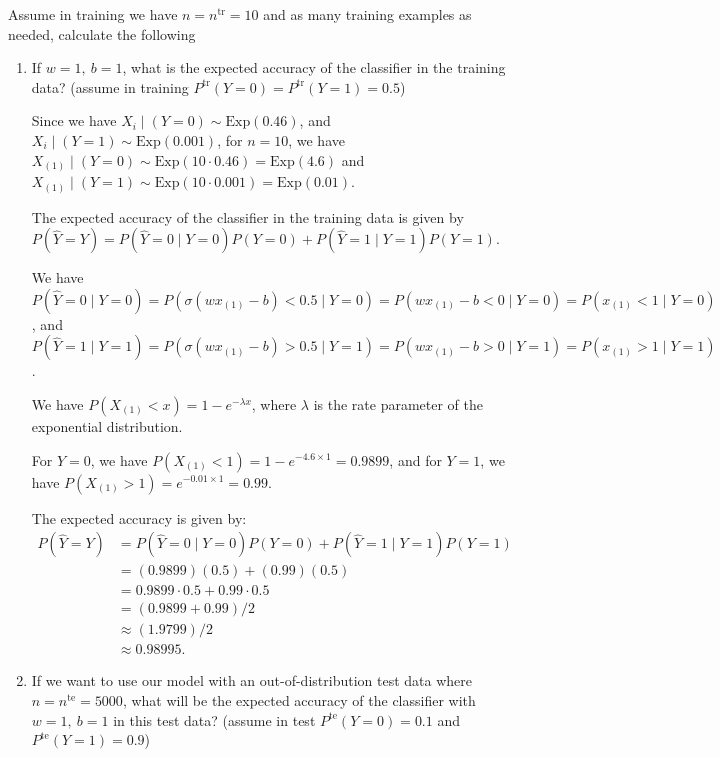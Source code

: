 \begin{enumerate}
Assume in training we have $n= n^\text{tr}=10$ and as many training examples as needed,
calculate the following \\
\begin{enumerate}
    \item If $w=1,\ b=1$, what is the expected accuracy of the classifier in the training data? (assume in training $P^\text{tr}(Y=0)=P^\text{tr}(Y=1)=0.5$)

    Since we have $X_i \mid (Y = 0) \sim \text{Exp}(0.46)$, and $X_i \mid (Y =
    1) \sim \text{Exp}(0.001)$, for $n=10$, we have $X_{(1)} \mid (Y = 0) \sim
    \text{Exp}(10 \cdot 0.46) = \text{Exp}(4.6)$ and $X_{(1)} \mid (Y = 1) \sim
    \text{Exp}(10 \cdot 0.001) = \text{Exp}(0.01)$.

    The expected accuracy of the classifier in the training data is given by
    $P(\hat{Y} = Y) = P(\hat{Y} = 0 \mid Y = 0) P(Y = 0) + P(\hat{Y} = 1 \mid Y
    = 1) P(Y = 1)$.

    We have $P(\hat{Y} = 0 \mid Y = 0) = P(\sigma(w x_{(1)} - b) < 0.5 \mid Y =
    0) = P(w x_{(1)} - b < 0 \mid Y = 0) = P(x_{(1)} < 1 \mid Y = 0)$, and
    $P(\hat{Y} = 1 \mid Y = 1) = P(\sigma(w x_{(1)} - b) > 0.5 \mid Y = 1) =
    P(w x_{(1)} - b > 0 \mid Y = 1) = P(x_{(1)} > 1 \mid Y = 1)$.

    We have $P(X_{(1)} < x) = 1 - e^{-\lambda x}$, where $\lambda$ is the
    rate parameter of the exponential distribution.
    
    For $Y = 0$, we have $P(X_{(1)} < 1) = 1 - e^{-4.6 \times 1} = 0.9899$, 
    and for $Y = 1$, we have $P(X_{(1)} > 1) = e^{-0.01 \times 1} = 0.99$.

    The expected accuracy is given by:
    \begin{align*}
        P(\hat{Y} = Y) &= P(\hat{Y} = 0 \mid Y = 0) P(Y = 0) + P(\hat{Y} = 1 \mid Y = 1) P(Y = 1)\\
        &= (0.9899)(0.5) + (0.99)(0.5)\\
        &= 0.9899 \cdot 0.5 + 0.99 \cdot 0.5\\
        &= (0.9899 + 0.99)/2\\
        &\approx (1.9799)/2\\
        &\approx 0.98995.
    \end{align*}

    \newpage
    \item If we want to use our model with an out-of-distribution test data where $n=n^\text{te}=5000$, what will be the expected accuracy of the classifier with $w=1,\ b=1$ in this test data? (assume in test $P^\text{te}(Y=0)=0.1$ and $P^\text{te}(Y=1)=0.9$)


\end{enumerate}
\end{enumerate}
